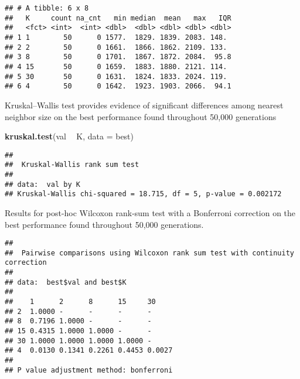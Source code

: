 \documentclass[]{book}
\newenvironment{Shaded}{\begin{snugshade}}{\end{snugshade}}
\newcommand{\DataTypeTok}[1]{\textcolor[rgb]{0.13,0.29,0.53}{#1}}
\newcommand{\KeywordTok}[1]{\textcolor[rgb]{0.13,0.29,0.53}{\textbf{#1}}}
\newcommand{\NormalTok}[1]{#1}
\newcommand{\OperatorTok}[1]{\textcolor[rgb]{0.81,0.36,0.00}{\textbf{#1}}}
\newcommand{\OtherTok}[1]{\textcolor[rgb]{0.56,0.35,0.01}{#1}}
\newcommand{\StringTok}[1]{\textcolor[rgb]{0.31,0.60,0.02}{#1}}
\begin{document}
\begin{verbatim}
## # A tibble: 6 x 8
##   K     count na_cnt   min median  mean   max   IQR
##   <fct> <int>  <int> <dbl>  <dbl> <dbl> <dbl> <dbl>
## 1 1        50      0 1577.  1829. 1839. 2083. 148. 
## 2 2        50      0 1661.  1866. 1862. 2109. 133. 
## 3 8        50      0 1701.  1867. 1872. 2084.  95.8
## 4 15       50      0 1659.  1883. 1880. 2121. 114. 
## 5 30       50      0 1631.  1824. 1833. 2024. 119. 
## 6 4        50      0 1642.  1923. 1903. 2066.  94.1
\end{verbatim}

Kruskal--Wallis test provides evidence of significant differences among nearest neighbor size on the best performance found throughout 50,000 generations

\begin{Shaded}
\begin{Highlighting}[]
\KeywordTok{kruskal.test}\NormalTok{(val }\OperatorTok{~}\StringTok{ }\NormalTok{K, }\DataTypeTok{data =}\NormalTok{ best)}
\end{Highlighting}
\end{Shaded}

\begin{verbatim}
## 
##  Kruskal-Wallis rank sum test
## 
## data:  val by K
## Kruskal-Wallis chi-squared = 18.715, df = 5, p-value = 0.002172
\end{verbatim}

Results for post-hoc Wilcoxon rank-sum test with a Bonferroni correction on the best performance found throughout 50,000 generations.

\begin{Shaded}
\end{Shaded}

\begin{verbatim}
## 
##  Pairwise comparisons using Wilcoxon rank sum test with continuity correction 
## 
## data:  best$val and best$K 
## 
##    1      2      8      15     30    
## 2  1.0000 -      -      -      -     
## 8  0.7196 1.0000 -      -      -     
## 15 0.4315 1.0000 1.0000 -      -     
## 30 1.0000 1.0000 1.0000 1.0000 -     
## 4  0.0130 0.1341 0.2261 0.4453 0.0027
## 
## P value adjustment method: bonferroni
\end{verbatim}
\end{document}
